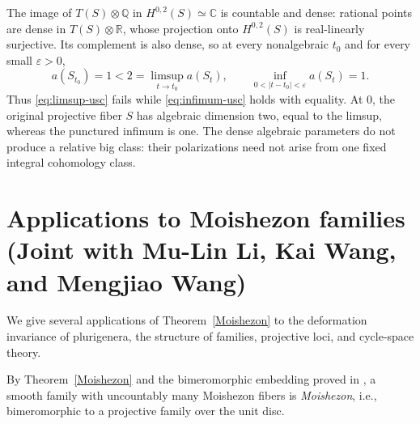 \documentclass[11pt]{amsart}
\numberwithin{equation}{section}
\theoremstyle{plain}
\theoremstyle{definition}
\newcommand{\C}{\mathbb C}
\newcommand{\Q}{\mathbb Q}
\newcommand{\R}{\mathbb R}
\begin{document}
The image of $T(S)\otimes\Q$ in $H^{0,2}(S)\simeq\C$ is countable and
dense: rational points are dense in $T(S)\otimes\R$, whose projection
onto $H^{0,2}(S)$ is real-linearly surjective.  Its complement is also
dense, so at every nonalgebraic $t_0$ and for every small $\varepsilon>0$,
\begin{equation*}
 a(S_{t_0})=1
 <2=\limsup_{t\to t_0}a(S_t),
 \qquad
 \inf_{0<|t-t_0|<\varepsilon}a(S_t)=1.
\end{equation*}
Thus \eqref{eq:limsup-usc} fails while \eqref{eq:infimum-usc} holds with
equality.  At $0$, the original projective fiber $S$ has algebraic
dimension two, equal to the limsup, whereas the punctured infimum is one.
The dense algebraic parameters do not
produce a relative big class: their polarizations need not arise from one
fixed integral cohomology class.


\appendix
\section[Applications to Moishezon families]
{Applications to Moishezon families\space
{(Joint with Mu-Lin Li, Kai Wang, and Mengjiao Wang)}}
\label{s:applications}

We give several applications of Theorem~\ref{Moishezon} to the deformation invariance of plurigenera, the structure of families, projective loci, and cycle-space theory.

By Theorem~\ref{Moishezon} and the bimeromorphic embedding proved in \cite{RT21,RT22}, a smooth family with uncountably many Moishezon fibers is \emph{Moishezon}, i.e., bimeromorphic to a projective family over the unit disc.
\end{document}
